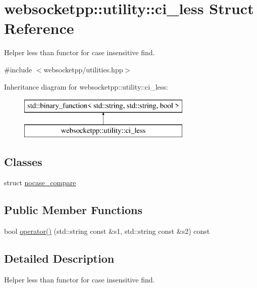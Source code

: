 \hypertarget{structwebsocketpp_1_1utility_1_1ci__less}{}\section{websocketpp\+:\+:utility\+:\+:ci\+\_\+less Struct Reference}
\label{structwebsocketpp_1_1utility_1_1ci__less}


Helper less than functor for case insensitive find.  




{\ttfamily \#include $<$websocketpp/utilities.\+hpp$>$}

Inheritance diagram for websocketpp\+:\+:utility\+:\+:ci\+\_\+less\+:\begin{figure}[H]
\begin{center}
\leavevmode
\includegraphics[height=2.000000cm]{structwebsocketpp_1_1utility_1_1ci__less}
\end{center}
\end{figure}
\subsection*{Classes}
\begin{DoxyCompactItemize}
\item 
struct \hyperlink{structwebsocketpp_1_1utility_1_1ci__less_1_1nocase__compare}{nocase\+\_\+compare}
\end{DoxyCompactItemize}
\subsection*{Public Member Functions}
\begin{DoxyCompactItemize}
\item 
bool \hyperlink{structwebsocketpp_1_1utility_1_1ci__less_aeda898edb0f7779e8384e1adc71f61bf}{operator()} (std\+::string const \&s1, std\+::string const \&s2) const 
\end{DoxyCompactItemize}


\subsection{Detailed Description}
Helper less than functor for case insensitive find. 

